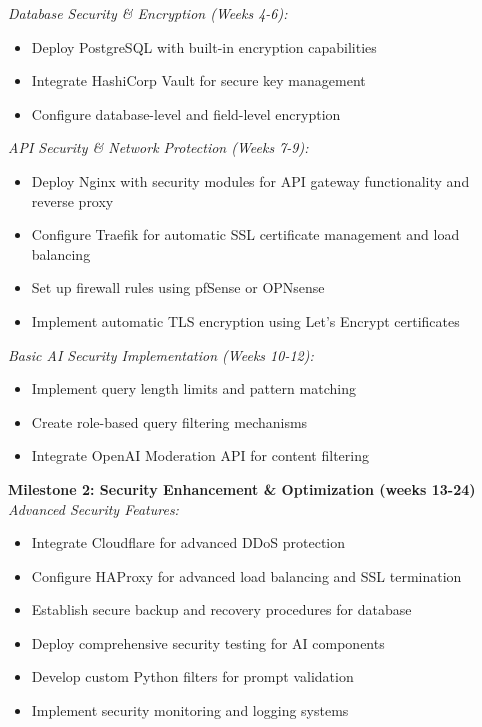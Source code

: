 \documentclass[a4paper, 12pt]{article}
\begin{document}
\textit{Database Security \& Encryption (Weeks 4-6):}
\begin{itemize}
    \item Deploy PostgreSQL with built-in encryption capabilities
    \item Integrate HashiCorp Vault for secure key management
    \item Configure database-level and field-level encryption
\end{itemize}

\textit{API Security \& Network Protection (Weeks 7-9):}
\begin{itemize}
    \item Deploy Nginx with security modules for API gateway functionality and reverse proxy
    \item Configure Traefik for automatic SSL certificate management and load balancing
    \item Set up firewall rules using pfSense or OPNsense
    \item Implement automatic TLS encryption using Let's Encrypt certificates
\end{itemize}

\textit{Basic AI Security Implementation (Weeks 10-12):}
\begin{itemize}
    \item Implement query length limits and pattern matching
    \item Create role-based query filtering mechanisms
    \item Integrate OpenAI Moderation API for content filtering
\end{itemize}

\textbf{Milestone 2: Security Enhancement \& Optimization (weeks 13-24)}\\
\textit{Advanced Security Features:}
\begin{itemize}
    \item Integrate Cloudflare for advanced DDoS protection 
    \item Configure HAProxy for advanced load balancing and SSL termination
    \item Establish secure backup and recovery procedures for database
    \item Deploy comprehensive security testing for AI components
    \item Develop custom Python filters for prompt validation
    \item Implement security monitoring and logging systems
\end{itemize}
\end{document}
